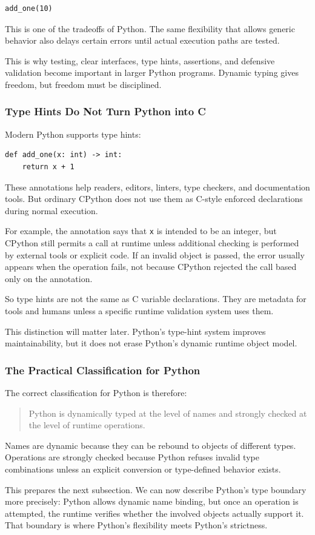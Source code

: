 \begin{verbatim}
add_one(10)
\end{verbatim}

This is one of the tradeoffs of Python. The same flexibility that allows generic behavior also delays certain errors until actual execution paths are tested.

This is why testing, clear interfaces, type hints, assertions, and defensive validation become important in larger Python programs. Dynamic typing gives freedom, but freedom must be disciplined.

\subsubsection*{Type Hints Do Not Turn Python into C}

Modern Python supports type hints:

\begin{verbatim}
def add_one(x: int) -> int:
    return x + 1
\end{verbatim}

These annotations help readers, editors, linters, type checkers, and documentation tools. But ordinary CPython does not use them as C-style enforced declarations during normal execution.

For example, the annotation says that \texttt{x} is intended to be an integer, but CPython still permits a call at runtime unless additional checking is performed by external tools or explicit code. If an invalid object is passed, the error usually appears when the operation fails, not because CPython rejected the call based only on the annotation.

So type hints are not the same as C variable declarations. They are metadata for tools and humans unless a specific runtime validation system uses them.

This distinction will matter later. Python's type-hint system improves maintainability, but it does not erase Python's dynamic runtime object model.

\subsubsection*{The Practical Classification for Python}

The correct classification for Python is therefore:

\begin{quote}
Python is dynamically typed at the level of names and strongly checked at the level of runtime operations.
\end{quote}

Names are dynamic because they can be rebound to objects of different types. Operations are strongly checked because Python refuses invalid type combinations unless an explicit conversion or type-defined behavior exists.

This prepares the next subsection. We can now describe Python's type boundary more precisely: Python allows dynamic name binding, but once an operation is attempted, the runtime verifies whether the involved objects actually support it. That boundary is where Python's flexibility meets Python's strictness.